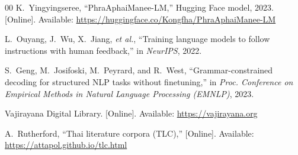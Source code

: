 \documentclass[conference]{IEEEtran}
\begin{document}
\begin{thebibliography}{00}
K.~Yingyingseree, ``PhraAphaiManee-LM,'' Hugging Face model, 2023.
[Online]. Available: \url{https://huggingface.co/Kongfha/PhraAphaiManee-LM}

L.~Ouyang, J.~Wu, X.~Jiang, \emph{et al.}, ``Training language models to
follow instructions with human feedback,'' in \emph{NeurIPS}, 2022.

S.~Geng, M.~Josifoski, M.~Peyrard, and R.~West, ``Grammar-constrained
decoding for structured NLP tasks without finetuning,'' in \emph{Proc.
Conference on Empirical Methods in Natural Language Processing (EMNLP)},
2023.

Vajirayana Digital Library. [Online]. Available: \url{https://vajirayana.org}

A.~Rutherford, ``Thai literature corpora (TLC),'' [Online]. Available:
\url{https://attapol.github.io/tlc.html}


\end{thebibliography}
\end{document}
